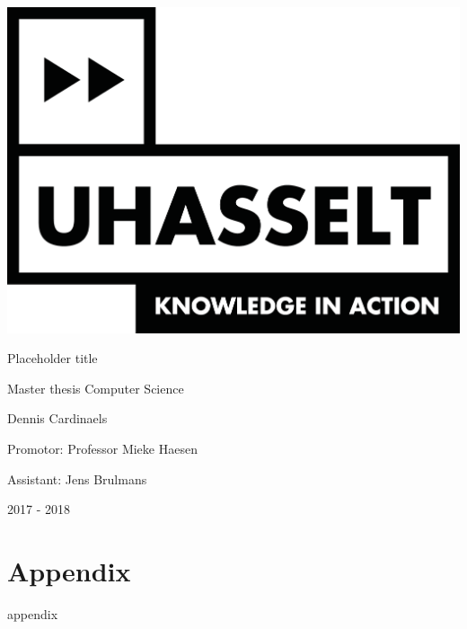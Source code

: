 \documentclass{article}
\begin{document}
	\begin{titlepage}

		\centering
		
		
		\includegraphics[scale=0.5]{logo_uhasselt}		
		\vspace{1cm}
		
		\Huge Placeholder title
		\vspace{0.4cm}
		
		\large Master thesis Computer Science
		\vspace{1cm}
		
		\LARGE Dennis Cardinaels
		\vspace{1cm}
		
		\large Promotor: Professor Mieke Haesen
		\vspace{0.2cm}
		
		Assistant: Jens Brulmans
		
		\vspace{1.2cm}
		
		
		\Large 2017 - 2018
		
	\end{titlepage}

	\cleardoublepage
	
	
	
	
	
	\tableofcontents
	\newpage
	
	
	
	
	

	

	

	

	

	
	
	\newpage
	\appendix
	\section{Appendix}
	appendix

	\newpage
	
	
\end{document}
